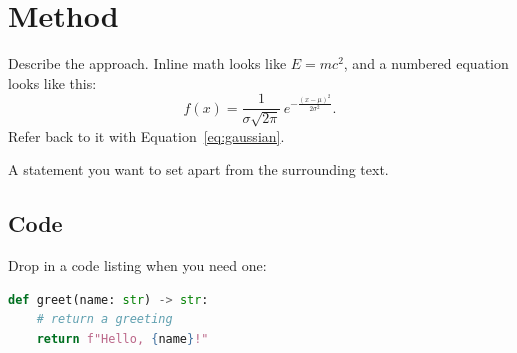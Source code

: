\section{Method}
\label{sec:method}
Describe the approach. Inline math looks like $E = mc^2$, and a
numbered equation looks like this:
\begin{equation}
  \label{eq:gaussian}
  f(x) = \frac{1}{\sigma\sqrt{2\pi}}\, e^{-\frac{(x-\mu)^2}{2\sigma^2}}.
\end{equation}
Refer back to it with Equation~\ref{eq:gaussian}.

\begin{definition}
A statement you want to set apart from the surrounding text.
\end{definition}

\subsection{Code}
Drop in a code listing when you need one:
\begin{lstlisting}[language=Python, caption={A short example.}]
def greet(name: str) -> str:
    # return a greeting
    return f"Hello, {name}!"
\end{lstlisting}
